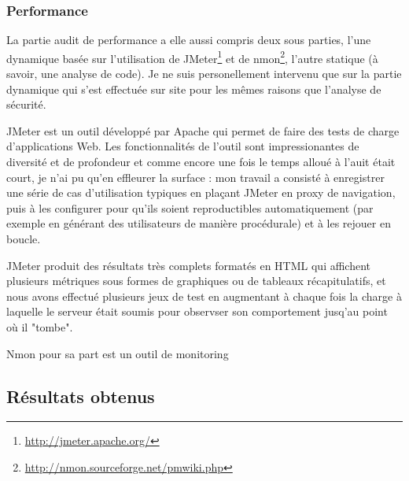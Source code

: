 \subsubsection{Performance}
La partie audit de performance a elle aussi compris deux sous parties, l'une dynamique basée sur l'utilisation de JMeter\footnote{\url{http://jmeter.apache.org/}} et de nmon\footnote{\url{http://nmon.sourceforge.net/pmwiki.php}}, l'autre statique (à savoir, une analyse de code). Je ne suis personellement intervenu que sur la partie dynamique qui s'est effectuée sur site pour les mêmes raisons que l'analyse de sécurité. 

JMeter est un outil développé par Apache qui permet de faire des tests de charge d'applications Web. Les fonctionnalités de l'outil sont impressionantes de diversité et de profondeur et comme encore une fois le temps alloué à l'auit était court, je n'ai pu qu'en effleurer la surface : mon travail a consisté à enregistrer une série de cas d'utilisation typiques en plaçant JMeter en proxy de navigation, puis à les configurer pour qu'ils soient reproductibles automatiquement (par exemple en générant des utilisateurs de manière procédurale) et à les rejouer en boucle. 

JMeter produit des résultats très complets formatés en HTML qui affichent plusieurs métriques sous formes de graphiques ou de tableaux récapitulatifs, et nous avons effectué plusieurs jeux de test en augmentant à chaque fois la charge à laquelle le serveur était soumis pour observser son comportement jusq'au point où il "tombe".

Nmon pour sa part est un outil de monitoring 

\subsubsection{}

\subsection{Résultats obtenus}
